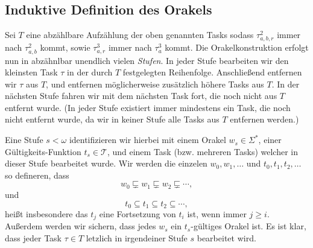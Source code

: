 \subsection*{Induktive Definition des Orakels}

Sei $T$ eine abzählbare Aufzählung der oben genannten Tasks sodass $\tau^2_{a,b,r}$ immer nach $\tau^2_{a,b}$ kommt, sowie $\tau^3_{a,r}$ immer nach $\tau^3_a$ kommt.
Die Orakelkonstruktion erfolgt nun in abzähnlbar unendlich vielen \emph{Stufen}. In jeder Stufe bearbeiten wir den kleinsten Task $\tau$ in der durch $T$ festgelegten Reihenfolge. Anschließend entfernen wir $\tau$ aus $T$, und entfernen möglicherweise zusätzlich höhere Tasks aus $T$.
In der nächsten Stufe fahren wir mit dem nächsten Task fort, die noch nicht aus $T$ entfernt wurde. (In jeder Stufe existiert immer mindestens ein Task, die noch nicht entfernt wurde, da wir in keiner Stufe alle Tasks aus $T$ entfernen werden.)

Eine Stufe $s<\omega$ identifizieren wir hierbei mit einem Orakel $w_s\in\Sigma^*$, einer Gültigkeits-Funktion $t_s\in\mathcal T$, und einem Task (bzw. mehreren Tasks) welcher in dieser Stufe bearbeitet wurde.
Wir werden die einzelen $w_0, w_1, \dots$ und $t_0, t_1, t_2, \dots$ so defineren, dass
\[ w_0\sqsubsetneq w_1 \sqsubsetneq w_2 \sqsubsetneq \cdots, \]
und 
\[ t_0 \subseteq t_1 \subseteq t_2 \subseteq \cdots, \]
heißt insbesondere das $t_j$ eine Fortsetzung von $t_i$ ist, wenn immer $j\geq i$.
Außerdem werden wir sichern, dass jedes $w_s$ ein $t_s$-gültiges Orakel ist.
Es ist klar, dass jeder Task $\tau\in T$ letzlich in irgendeiner Stufe $s$ bearbeitet wird.


